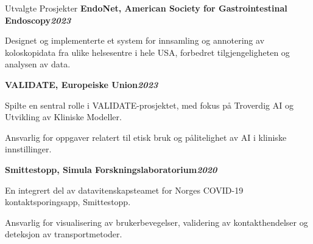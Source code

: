\begin{rubric}{Utvalgte Prosjekter}
%
\entry*[]%
\textbf{EndoNet, American Society for Gastrointestinal Endoscopy\hfill\textit{}\hfill\textit{2023}} \par
\begin{compactitem}
    \item Designet og implementerte et system for innsamling og annotering av koloskopidata fra ulike helsesentre i hele USA, forbedret tilgjengeligheten og analysen av data.
    \vspace{-12pt}
\end{compactitem}
%
\entry*[]%
\textbf{VALIDATE, Europeiske Union\hfill\textit{2023}}
\begin{compactitem}
    \item Spilte en sentral rolle i VALIDATE-prosjektet, med fokus på Troverdig AI og Utvikling av Kliniske Modeller.
    \item Ansvarlig for oppgaver relatert til etisk bruk og pålitelighet av AI i kliniske innstillinger.
    \vspace{-12pt}
\end{compactitem}
%
%
\entry*[]%
\textbf{Smittestopp, Simula Forskningslaboratorium\hfill\textit{2020}} \par
\begin{compactitem}
    \item En integrert del av datavitenskapsteamet for Norges COVID-19 kontaktsporingsapp, Smittestopp.
    \item Ansvarlig for visualisering av brukerbevegelser, validering av kontakthendelser og deteksjon av transportmetoder.
    \vspace{-12pt}
\end{compactitem}
%

\end{rubric}
